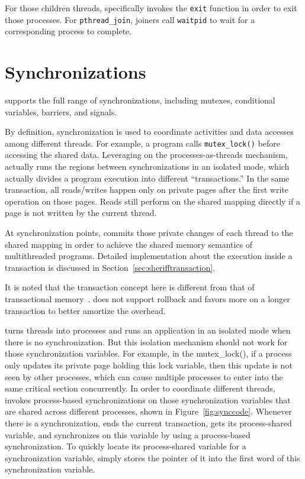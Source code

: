 For those children threads, \sheriff{} specifically invokes the \texttt{exit} function in order to exit those processes. For \texttt{pthread\_join}, joiners call \texttt{waitpid} to wait for a corresponding process to complete.  

\section{Synchronizations}
\label{sec:sheriffsync}

\sheriff{} supports the full range of synchronizations, including mutexes, conditional variables, barriers, and signals. 

By definition, synchronization is used to coordinate activities and data accesses among different threads. For example, a program calls \texttt{mutex\_lock()} before accessing the shared data. Leveraging on the processes-as-threads mechanism, \sheriff{} actually runs the regions between synchronizations in an isolated mode, which actually divides a program execution into different ``transactions.'' In the same transaction, all reads/writes happen only on private pages after the first write operation on those pages. Reads still perform on the shared mapping directly if a page is not written by the current thread.

At synchronization points, \sheriff{} commits those private changes of each thread to the shared mapping in order to achieve the shared memory semantics of multithreaded programs. Detailed implementation about the execution inside a transaction is discussed in Section~\ref{sec:sherifftransaction}. 

It is noted that the transaction concept here is different from that of transactional memory~\cite{transaction}. \sheriff{} does not support rollback and favors more on a longer transaction to better amortize the overhead. 

\sheriff{} turns threads into processes and runs an application in an isolated mode when there is no synchronization. But this isolation mechanism should not work for those synchronization variables. For example, in the mutex\_lock(), if a process only updates its private page holding this lock variable, then this update is not seen by other processes, which can cause multiple processes to enter into the same critical section concurrently. In order to coordinate different threads, \sheriff{} invokes process-based synchronizations on those synchronization variables that are shared across different processes, shown in Figure~\ref{fig:synccode}. Whenever there is a synchronization, \sheriff{} ends the current transaction, gets its process-shared variable, and synchronizes on this variable by using a process-based synchronization. To quickly locate its process-shared variable for a synchronization variable, \sheriff{} simply stores the pointer of it into the first word of this synchronization variable. 
 
